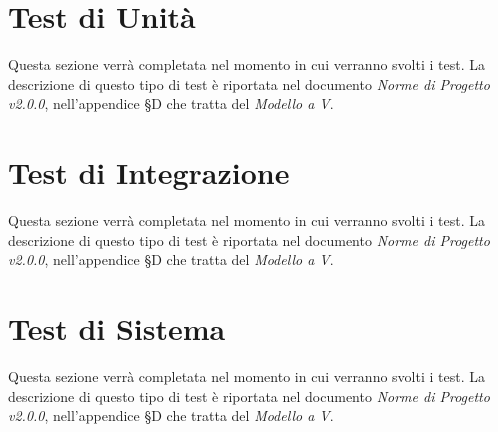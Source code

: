 \section{Test di Unità}
\label{test_u}
Questa sezione verrà completata nel momento in cui verranno svolti i test. La descrizione di questo tipo di test è riportata nel documento \textit{Norme di Progetto v2.0.0}, nell'appendice §D che tratta del \textit{Modello a V}.

\newpage
\section{Test di Integrazione}
\label{test_i}
Questa sezione verrà completata nel momento in cui verranno svolti i test. La descrizione di questo tipo di test è riportata nel documento \textit{Norme di Progetto v2.0.0}, nell'appendice §D che tratta del \textit{Modello a V}.

\newpage
\section{Test di Sistema}
\label{test_s}
Questa sezione verrà completata nel momento in cui verranno svolti i test. La descrizione di questo tipo di test è riportata nel documento \textit{Norme di Progetto v2.0.0}, nell'appendice §D che tratta del \textit{Modello a V}.
\newpage